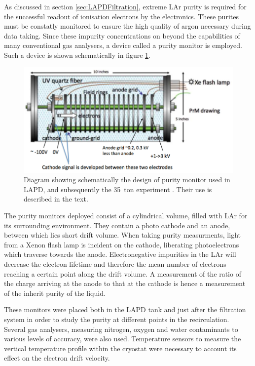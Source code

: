 As discussed in section \ref{sec:LAPDFiltration}, extreme LAr purity is required for the successful readout of ionisation electrons by the electronics.  These purites must be constatly monitored to ensure the high quality of argon necessary during data taking.  Since these impurity concentrations on beyond the capabilities of many conventional gas analysers, a device called a purity monitor is employed.  Such a device is shown schematically in figure \ref{fig:PurityMonitor}.

\begin{figure}[ht]
  \centering
  \includegraphics[width=12cm]{PurityMonitor.png}
  \caption[Design of LAPD and 35~ton style purity monitors]{Diagram showing schematically the design of purity monitor used in LAPD, and subsequently the 35~ton experiment \cite{LBNE35tonPhaseI}.  Their use is described in the text.}
  \label{fig:PurityMonitor}
\end{figure}

The purity monitors deployed consist of a cylindrical volume, filled with LAr for its surrounding environment.  They contain a photo cathode and an anode, between which lies short drift volume.  When taking purity measurments, light from a Xenon flash lamp is incident on the cathode, liberating photoelectrons which traverse towards the anode.  Electronegative impurities in the LAr will decrease the electron lifetime and therefore the mean number of electrons reaching a certain point along the drift volume.  A measurement of the ratio of the charge arriving at the anode to that at the cathode is hence a measurement of the inherit purity of the liquid.

These monitors were placed both in the LAPD tank and just after the filtration system in order to study the purity at different points in the recirculation.  Several gas analysers, measuring nitrogen, oxygen and water contaminants to various levels of accuracy, were also used.  Temperature sensors to measure the vertical temperature profile within the cryostat were necessary to account its effect on the electron drift velocity.

